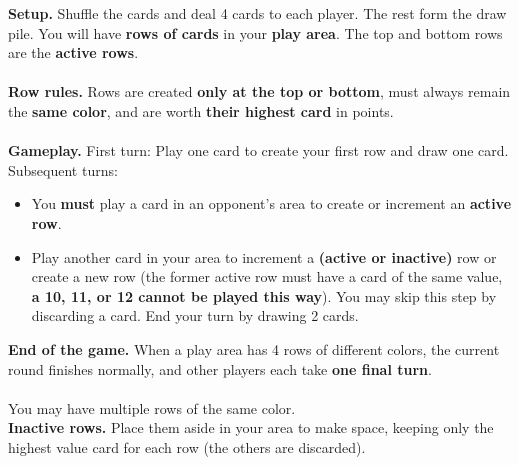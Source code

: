 \documentclass[a4paper]{memoir}
\begin{document}
{\footnotesize

\noindent
\textbf{ Setup.} Shuffle the cards and deal 4 cards to each player. 
The rest form the draw pile. You will have \textbf{rows of cards} in your \textbf{play area}.
The top and bottom rows are the \textbf{active rows}.
\\
\\
\textbf{ Row rules.} Rows are created \textbf{only at the top or bottom}, 
must always remain the \textbf{same color}, and are worth \textbf{their highest card} in points.
\\
\\
\noindent
\textbf{ Gameplay.}  
First turn: Play one card to create your first row and draw one card. 
Subsequent turns:
\begin{itemize}
    \item {} You \textbf{must} play a card in an opponent's area to create or increment an \textbf{active row}.
    \item {} Play another card in your area to increment a \textbf{(active or inactive)} row or create a new row 
    (the former active row must have a card of the same value, \textbf{a 10, 11, or 12 cannot be played this way}). You may skip this step by discarding a card. End your turn by drawing 2 cards.
\end{itemize} 
\textbf{ End of the game.}
When a play area has 4 rows of different colors, the current round finishes normally, and other players each take \textbf{one final turn}.
\\
\\
\noindent
{} You may have multiple rows of the same color.
\\
\textbf{ Inactive rows.} Place them aside in your area to make space, keeping only the highest value card for each row (the others are discarded).
}
\end{document}
